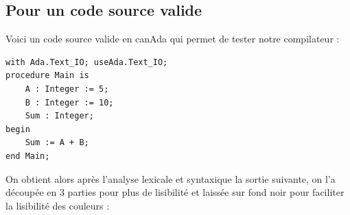 \documentclass[french,a4paper]{article}
\begin{document}
    \subsection{Pour un code source valide}\label{subsec:pour-un-code-source-valide}

    Voici un code source valide en canAda qui permet de tester notre compilateur :

    \begin{lstlisting}[label={lst:lstlisting16}]
with Ada.Text_IO; useAda.Text_IO;
procedure Main is
    A : Integer := 5;
    B : Integer := 10;
    Sum : Integer;
begin
    Sum := A + B;
end Main;
    \end{lstlisting}

    On obtient alors après l'analyse lexicale et syntaxique la sortie suivante, on l'a découpée en 3 parties pour plus de lisibilité et laissée sur fond noir pour faciliter la lisibilité des couleurs :
\end{document}
